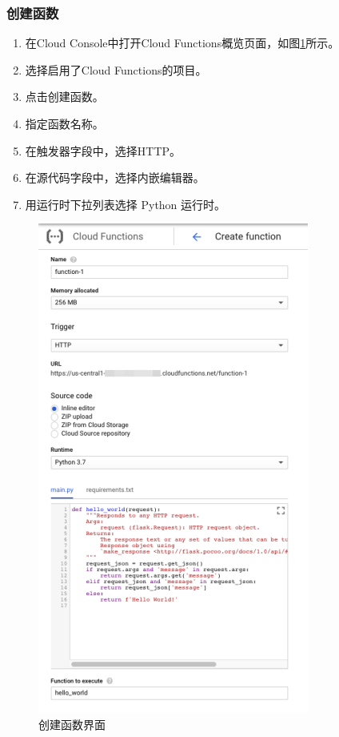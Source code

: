 \documentclass[11pt]{article}
\begin{document}
\begin{multicols}{2}
\subsubsection{创建函数} 
\begin{enumerate}
	\item 在Cloud Console中打开Cloud Functions概览页面，如图\ref{fig15}所示。
	\item 选择启用了Cloud Functions的项目。
	\item 点击创建函数。
	\item 指定函数名称。
	\item 在触发器字段中，选择HTTP。
	\item 在源代码字段中，选择内嵌编辑器。
	\item 用运行时下拉列表选择 Python 运行时。
\end{enumerate}
 \begin{figure}[H]
 	\centering
 	\includegraphics[width=\linewidth]{figs/15.png}
 	\caption{创建函数界面}
 	\label{fig15}	
 \end{figure}
\end{multicols}
\end{document}
